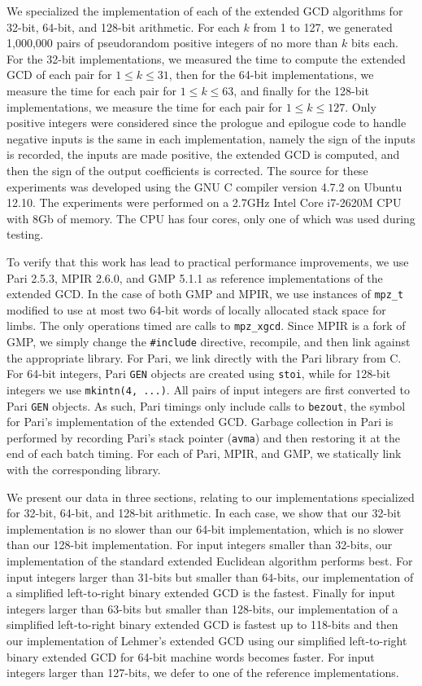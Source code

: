 \documentclass{ucalgthes1}
\theoremstyle{definition}
\newcommand{\compiler}{GNU C compiler version 4.7.2}
\newcommand{\cpu}{2.7GHz Intel Core i7-2620M CPU}
\newcommand{\GMP}{GMP 5.1.1}
\newcommand{\Pari}{Pari 2.5.3}
\newcommand{\MPIR}{MPIR 2.6.0}
\begin{document}
We specialized the implementation of each of the extended GCD algorithms for 32-bit, 64-bit, and 128-bit arithmetic.  For each $k$ from 1 to 127, we generated 1,000,000 pairs of pseudorandom positive integers of no more than $k$ bits each.  For the 32-bit implementations, we measured the time to compute the extended GCD of each pair for $1 \le k \le 31$, then for the 64-bit implementations, we measure the time for each pair for $1 \le k \le 63$, and finally for the 128-bit implementations, we measure the time for each pair for $1 \le k \le 127$.  Only positive integers were considered since the prologue and epilogue code to handle negative inputs is the same in each implementation, namely the sign of the inputs is recorded, the inputs are made positive, the extended GCD is computed, and then the sign of the output coefficients is corrected.  The source for these experiments was developed using the \compiler{} on Ubuntu 12.10.  The experiments were performed on a \cpu{} with 8Gb of memory.  The CPU has four cores, only one of which was used during testing.

To verify that this work has lead to practical performance improvements, we use \Pari{}, \MPIR{}, and \GMP{} as reference implementations of the extended GCD.  In the case of both GMP and MPIR, we use instances of \texttt{mpz\_t} modified to use at most two 64-bit words of locally allocated stack space for limbs.  The only operations timed are calls to \texttt{mpz\_xgcd}.  Since MPIR is a fork of GMP, we simply change the \texttt{\#include} directive, recompile, and then link against the appropriate library.  For Pari, we link directly with the Pari library from C.  For 64-bit integers, Pari \texttt{GEN} objects are created using \texttt{stoi}, while for 128-bit integers we use \texttt{mkintn(4, ...)}.  All pairs of input integers are first converted to Pari \texttt{GEN} objects.  As such, Pari timings only include calls to \texttt{bezout}, the symbol for Pari's implementation of the extended GCD.  Garbage collection in Pari is performed by recording Pari's stack pointer (\texttt{avma}) and then restoring it at the end of each batch timing.  For each of Pari, MPIR, and GMP, we statically link with the corresponding library.

We present our data in three sections, relating to our implementations specialized for 32-bit, 64-bit, and 128-bit arithmetic.  In each case, we show that our 32-bit implementation is no slower than our 64-bit implementation, which is no slower than our 128-bit implementation.  For input integers smaller than 32-bits, our implementation of the standard extended Euclidean algorithm performs best.  For input integers larger than 31-bits but smaller than 64-bits, our implementation of a simplified left-to-right binary extended GCD is the fastest.  Finally for input integers larger than 63-bits but smaller than 128-bits, our implementation of a simplified left-to-right binary extended GCD is fastest up to 118-bits and then our implementation of Lehmer's extended GCD using our simplified left-to-right binary extended GCD for 64-bit machine words becomes faster.  For input integers larger than 127-bits, we defer to one of the reference implementations.
\end{document}
